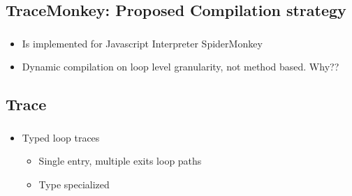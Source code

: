 \documentclass[mathserif,10pt]{beamer}
\begin{document}
\subsection{TraceMonkey: Proposed Compilation strategy}
\frame
{
  \frametitle{\subsecname}
  \begin{itemize}
    \item Is implemented for Javascript Interpreter SpiderMonkey
    \item Dynamic compilation on loop level granularity, not method based. Why??
  \end{itemize}
}
\subsection{Trace}
\frame
{
  \frametitle{\subsecname}
  \begin{itemize}
    \item Typed loop traces
    \begin{itemize}
      \item Single entry, multiple exits loop paths
      \item Type specialized
    \end{itemize}
  \end{itemize}
}
\end{document}
